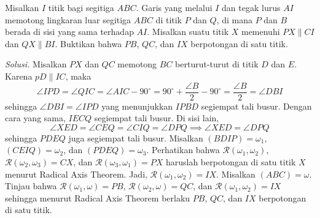 \documentclass[12pt]{scrartcl}
\newcommand{\siku}[4][.21cm]
	{
	\coordinate (tempa) at ($(#3)!#1!(#2)$);
	\coordinate (tempb) at ($(#3)!#1!(#4)$);
	\coordinate (tempc) at ($(tempa)!0.5!(tempb)$);%
	\draw[black] (tempa) -- ($(#3)!2!(tempc)$) -- (tempb);
	}
\begin{document}
\newpage
\begin{tcolorbox}[title=\textbf{Soal 9: PUMaC 2017/3}]
Misalkan $I$ titik bagi segitiga $ABC$. Garis yang melalui $I$ dan tegak lurus $AI$ memotong lingkaran luar segitiga $ABC$ di titik $P$ dan $Q$, di mana $P$ dan $B$ berada di sisi yang sama terhadap $AI$. Misalkan suatu titik $X$ memenuhi $PX\parallel CI$ dan $QX\parallel BI$. Buktikan bahwa $PB$, $QC$, dan $IX$ berpotongan di satu titik.
\end{tcolorbox}
\noindent\textit{Solusi.} Misalkan $PX$ dan $QC$ memotong $BC$ berturut-turut di titik $D$ dan $E$. Karena $pD\parallel IC$, maka
\[\angle IPD = \angle QIC = \angle AIC - 90^\circ = 90^\circ +\frac{\angle B}{2} -90^\circ = \frac{\angle B}{2} = \angle DBI\]
sehingga $\angle DBI=\angle IPD$ yang menunjukkan $IPBD$ segiempat tali busur. Dengan cara yang sama, $IECQ$ segiempat tali busur. Di sisi lain,
\[\angle XED = \angle CEQ = \angle CIQ= \angle DPQ \implies \angle XED = \angle DPQ\]
sehingga $PDEQ$ juga segiempat tali busur. Misalkan $(BDIP)=\omega_1$, $(CEIQ)=\omega_2$, dan $(PDEQ)=\omega_3$. Perhatikan bahwa $\mathcal{R}(\omega_1,\omega_2)$, $\mathcal{R}(\omega_2,\omega_3) = CX$, dan $\mathcal{R}(\omega_3,\omega_1)=PX$ haruslah berpotongan di satu titik $X$ menurut Radical Axis Theorem. Jadi, $\mathcal{R}(\omega_1,\omega_2)= IX$. Misalkan $(ABC)=\omega$. Tinjau bahwa $\mathcal{R}(\omega_1,\omega)=PB$, $\mathcal{R}(\omega_2,\omega)=QC$, dan $\mathcal{R}(\omega_1,\omega_2)=IX$ sehingga menurut Radical Axis Theorem berlaku $PB$, $QC$, dan $IX$ berpotongan di satu titik.
\begin{center}
\end{center}
\end{document}
